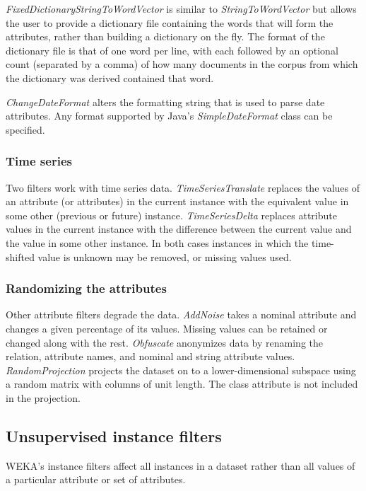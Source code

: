\textit{FixedDictionaryStringToWordVector} is similar to
\textit{StringToWordVector} but allows the user to provide a
dictionary file containing the words that will form the attributes,
rather than building a dictionary on the fly.  The format of the
dictionary file is that of one word per line, with each followed by an
optional count (separated by a comma) of how many documents in the
corpus from which the dictionary was derived contained that word.

\textit{ChangeDateFormat} alters the formatting string that is used to
parse date attributes. Any format supported by Java's
\textit{SimpleDateFormat} class can be specified.

\subsubsection{Time series}

Two filters work with time series data. \textit{TimeSeriesTranslate}
replaces the values of an attribute (or attributes) in the current
instance with the equivalent value in some other (previous or future)
instance. \textit{TimeSeriesDelta} replaces attribute values in the
current instance with the difference between the current value and the
value in some other instance. In both cases instances in which the
time-shifted value is unknown may be removed, or missing values used.

\subsubsection{Randomizing the attributes}

Other attribute filters degrade the data. \textit{AddNoise} takes a
nominal attribute and changes a given percentage of its
values. Missing values can be retained or changed along with the
rest. \textit{Obfuscate} anonymizes data by renaming the relation,
attribute names, and nominal and string attribute
values. \textit{RandomProjection} projects the dataset on to a
lower-dimensional subspace using a random matrix with columns of unit
length. The class attribute is not included in the projection.

\subsection{Unsupervised instance filters}

WEKA's instance filters affect all instances in a dataset rather than
all values of a particular attribute or set of attributes.

